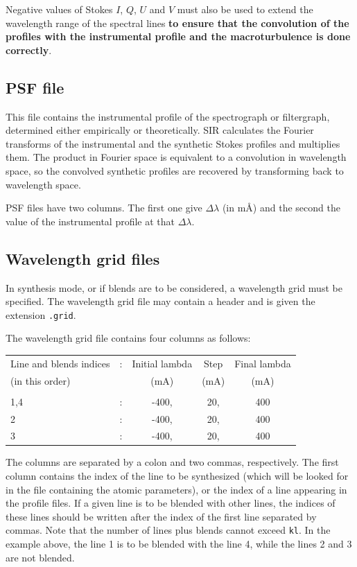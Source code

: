Negative values of Stokes $I$, $Q$, $U$ and $V$ must also be used
to extend the wavelength range of the spectral lines {\bf to ensure
that the convolution of the profiles with the instrumental profile
and the macroturbulence is done correctly}.  

\subsection{PSF file}
This file contains the instrumental profile of the spectrograph or
filtergraph, determined either empirically or theoretically. SIR 
calculates the Fourier transforms of the instrumental and the 
synthetic Stokes profiles and multiplies them. The product in 
Fourier space is equivalent to a convolution in wavelength 
space, so the convolved synthetic profiles are recovered 
by transforming back to wavelength space. 

PSF files have two columns. The first one give $\Delta \lambda$ (in
m\AA\/) and the second the value of the instrumental profile at 
that $\Delta \lambda$.

\subsection{Wavelength grid files}
In synthesis mode, or if blends are to be considered, a wavelength grid
must be specified. The wavelength grid file may contain a header and is 
given the extension {\tt .grid}.

The wavelength grid file contains four columns as follows:
\begin{center}
\begin{tabular}{lcccc}
Line and blends indices  & : &  Initial lambda &     Step  &    Final lambda \\
(in this order)          & &          (mA)    &       (mA) &         (mA)  \\
& & & & \\
1,4                      &  : &        -400,  &         20,  &        400 \\
2                        &  : &        -400,  &         20,  &        400 \\ 
3                        &  : &        -400,  &         20,  &        400 \\
\end{tabular}
\end{center} 

The columns are separated by a colon and two commas, respectively. The
first column contains the index of the line to be synthesized (which
will be looked for in the file containing the atomic parameters), or
the index of a line appearing in the profile files. If a given line is
to be blended with other lines, the indices of these lines should be
written after the index of the first line separated by commas. Note
that the number of lines plus blends cannot exceed {\tt kl}. In the
example above, the line 1 is to be blended with the line 4, while the
lines 2 and 3 are not blended.

